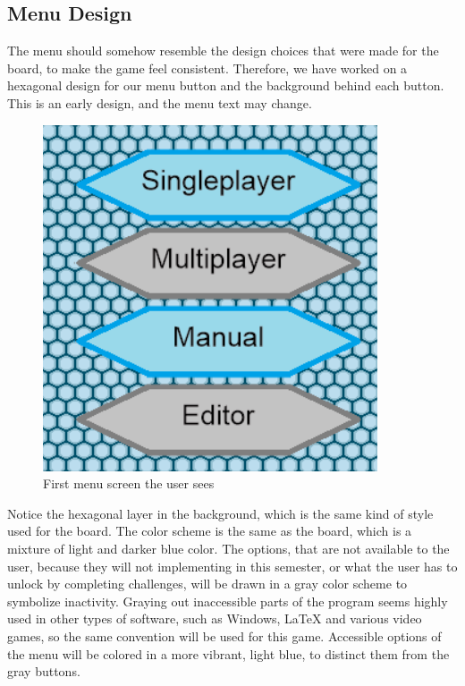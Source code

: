 
\subsection{Menu Design}
The menu should somehow resemble the design choices that were made for the board, to make the game feel consistent.
Therefore, we have worked on a hexagonal design for our menu button and the background behind each button.
This is an early design, and the menu text may change.\newline

\begin{figure}[h]
	\centering
		\includegraphics{img/Menu1.png}
	\caption{First menu screen the user sees}
	\label{fig:menu1}
\end{figure}

Notice the hexagonal layer in the background, which is the same kind of style used for the board.
The color scheme is the same as the board, which is a mixture of light and darker blue color. 
The options, that are not available to the user, because they will not implementing in this semester, or what the user has to unlock by completing challenges, will be drawn in a gray color scheme to symbolize inactivity.
Graying out inaccessible parts of the program seems highly used in other types of software, such as Windows, LaTeX and various video games, so the same convention will be used for this game.
Accessible options of the menu will be colored in a more vibrant, light blue, to distinct them from the gray buttons.\newline


